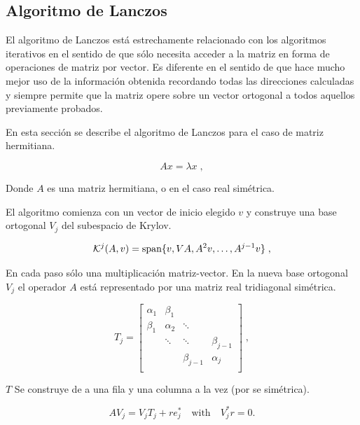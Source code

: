 \documentclass[a4paper,openright,12pt, oneside]{book}
\begin{document}
\subsection{Algoritmo de Lanczos}

El algoritmo de Lanczos est\'a estrechamente relacionado con los algoritmos iterativos en el sentido de que s\'olo necesita acceder a la matriz en forma de operaciones de matriz por vector. Es diferente en el sentido de que hace mucho mejor uso de la informaci\'on obtenida recordando todas las direcciones calculadas y siempre permite que la matriz opere sobre un vector ortogonal a todos aquellos previamente probados.

En esta secci\'on se describe el algoritmo de Lanczos para el caso de matriz hermitiana.

\begin{displaymath}
Ax=\lambda x\;,
\end{displaymath}

Donde $ A $ es una matriz hermitiana, o en el caso real sim\'etrica.

El algoritmo comienza con un vector de inicio elegido $ v $ y construye una base ortogonal $ V_j $ del subespacio de Krylov.

 \begin{equation}
{\cal K}^j(A,v)=\mbox{span}\{v,VA,A^2v,\dots,A^{j-1}v\}\;,
\end{equation}
 
En cada paso s\'olo una multiplicaci\'on matriz-vector. En la nueva base ortogonal $ V_j $ el operador $ A $ est\'a representado por una matriz real tridiagonal sim\'etrica. 

\begin{equation}
T_{j}=\left[
\begin{array}{cccc}\alpha_1 & \beta_1 &&\\
\beta_1 & \alpha_2 &\ddots&\\
&\ddots&\ddots&\beta_{j-1}\\
&&\beta_{j-1}&\alpha_j\\
\end{array} \right]\;,
\end{equation}

$T$ Se construye de a una fila y una columna a la vez (por se sim\'etrica).

\begin{equation}
AV_j=V_{j}T_{j}+re_j^{\ast} \quad \mbox{with} \quad V^{\ast}_j r = 0.
\end{equation}
\end{document}
